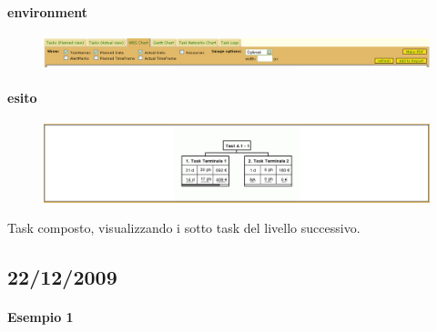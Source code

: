 \paragraph{environment}
\begin{figure}
\centering
\includegraphics[width=\textwidth]{tests/TEST_WBS/4.1/4.1_1/Esempio_3/environment.png}
\end{figure}
\paragraph{esito}
\begin{figure}
\centering
\includegraphics[width=\textwidth]{tests/TEST_WBS/4.1/4.1_1/Esempio_3/output.png}
\end{figure}

Task composto, visualizzando i sotto task del livello successivo.

\subsection{22/12/2009}
\paragraph{Esempio 1}
